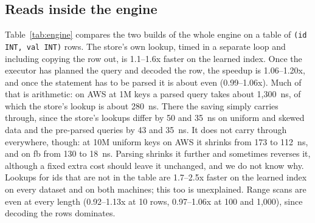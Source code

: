 \documentclass[conference]{IEEEtran}
\begin{document}
\subsection{Reads inside the engine}

Table~\ref{tab:engine} compares the two builds of the whole engine on a
table of \texttt{(id INT, val INT)} rows. The store's own lookup, timed in a
separate loop and including copying the row out, is 1.1--1.6x faster on the
learned index. Once the executor has planned the query and decoded the row, the
speedup is 1.06--1.20x, and once the statement has to be parsed it is about even
(0.99--1.06x). Much of that is arithmetic: on AWS at 1M keys a parsed query takes
about 1,300~ns, of which the store's lookup is about 280~ns. There the saving
simply carries through, since the store's lookups differ by 50 and 35~ns on
uniform and skewed data and the pre-parsed queries by 43 and 35~ns. It does not
carry through everywhere, though: at 10M uniform keys on AWS it shrinks from 173
to 112~ns, and on fb from 130 to 18~ns. Parsing shrinks it further and sometimes
reverses it, although a fixed extra cost should leave it unchanged, and we do not
know why. Lookups for ids that are not in the table are 1.7--2.5x faster on the
learned index on every dataset and on both machines; this too is unexplained.
Range scans are even at every length (0.92--1.13x at 10
rows, 0.97--1.06x at 100 and 1,000), since decoding the rows dominates.
\end{document}
